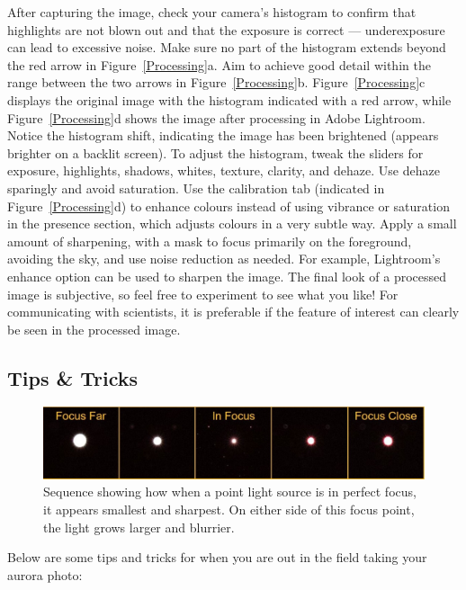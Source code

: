 \documentclass{article}
\begin{document}
After capturing the image, check your camera's histogram to confirm that highlights are not blown out and that the exposure is correct --- underexposure can lead to excessive noise. Make sure no part of the histogram extends beyond the red arrow in Figure~\ref{Processing}a. Aim to achieve good detail within the range between the two arrows in Figure~\ref{Processing}b. Figure~\ref{Processing}c displays the original image with the histogram indicated with a red arrow, while Figure~\ref{Processing}d shows the image after processing in Adobe Lightroom. Notice the histogram shift, indicating the image has been brightened (appears brighter on a backlit screen). To adjust the histogram, tweak the sliders for exposure, highlights, shadows, whites, texture, clarity, and dehaze. Use dehaze sparingly and avoid saturation. Use the calibration tab (indicated in Figure~\ref{Processing}d) to enhance colours instead of using vibrance or saturation in the presence section, which adjusts colours in a very subtle way. Apply a small amount of sharpening, with a mask to focus primarily on the foreground, avoiding the sky, and use noise reduction as needed. For example, Lightroom’s enhance option can be used to sharpen the image. The final look of a processed image is subjective, so feel free to experiment to see what you like! For communicating with scientists, it is preferable if the feature of interest can clearly be seen in the processed image. 



\subsection{Tips \& Tricks}


\begin{figure}
  \includegraphics[width=\linewidth]{Fig14_focusing.jpg}
  \caption{Sequence showing how when a point light source is in perfect focus, it appears smallest and sharpest. On either side of this focus point, the light grows larger and blurrier.}
  \label{Focusing}
\end{figure}



Below are some tips and tricks for when you are out in the field taking your aurora photo:
\end{document}
